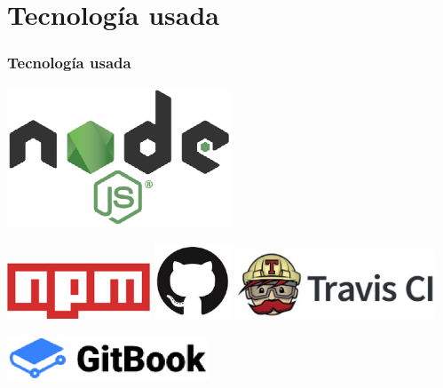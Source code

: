 \documentclass{beamer}
\begin{document}
\begin{frame}
\begin{columns}
\begin{column}{5cm}
    \end{column}
  \end{columns}
  
\end{frame}


\section{Tecnología usada}
\begin{frame}
  \frametitle{Tecnología usada}
  
  \begin{center}
  	\includegraphics[width=0.5\textwidth]{images/nodejs-logo.eps}
  \end{center}
  \vspace{-1cm}
  \begin{center}
  	\includegraphics[width=0.32\textwidth]{images/npm.eps}
    \hspace*{1cm}
    \includegraphics[width=0.17\textwidth]{images/github.eps}
    \hspace*{0.3cm}
    \includegraphics[width=0.45\textwidth]{images/travis-ci-logo.eps} 
  \end{center}
  
  \begin{center}
  	\includegraphics[width=0.45\textwidth]{images/gitbook.eps}
  \end{center}
  
\end{frame}
\end{document}
